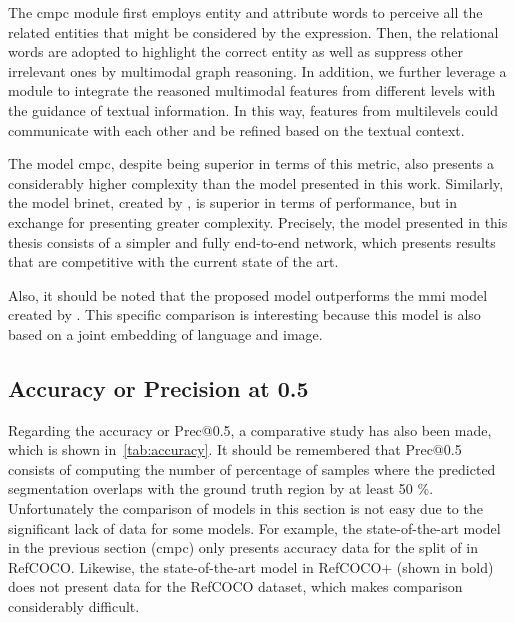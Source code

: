 \begin{quoteBox}
  The \gls{cmpc} module first employs entity and attribute words to perceive
  all the related entities that might be considered by the expression. Then,
  the relational words are adopted to highlight the correct entity as well as
  suppress other irrelevant ones by multimodal graph reasoning. In addition, we
  further leverage a module to integrate the reasoned multimodal features from
  different levels with the guidance of textual information. In this way,
  features from multilevels could communicate with each other and be refined
  based on the textual context.
  \tcblower{}
\end{quoteBox}

The model \gls{cmpc}, despite being superior in terms of this metric, also
presents a considerably higher complexity than the model presented in this
work. Similarly, the model \gls{brinet}, created by
, is superior in terms of performance,
but in exchange for presenting greater complexity. Precisely, the model
presented in this thesis consists of a simpler and fully end-to-end network,
which presents results that are competitive with the current state of the art.

Also, it should be noted that the proposed model outperforms the \gls{mmi}
model created by . This specific comparison is interesting
because this model is also based on a joint embedding of language and image.


\subsection{Accuracy or Precision at 0.5}\label{sec:accuracy}

Regarding the accuracy or Prec@0.5, a comparative study has also been made,
which is shown in\ \vref{tab:accuracy}. It should be remembered that Prec@0.5
consists of computing the number of percentage of samples where the predicted
segmentation overlaps with the ground truth region by at least 50
\%. Unfortunately the comparison of models in this section is not easy due to
the significant lack of data for some models. For example, the state-of-the-art
model in the previous section (\gls{cmpc}) only presents accuracy data for the
split of  in RefCOCO\@. Likewise, the state-of-the-art model in
RefCOCO+ (shown in bold) does not present data for the RefCOCO dataset, which
makes comparison considerably difficult.

